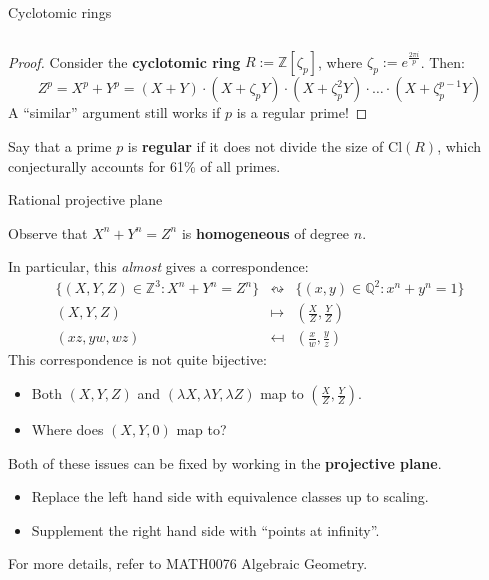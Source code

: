 \documentclass[10pt]{beamer}
\theoremstyle{definition}
\begin{document}
\begin{frame}[t]{Cyclotomic rings}
\begin{columns}[T]
\end{columns}

\begin{proof}
Consider the \textbf{cyclotomic ring} $ R := \mathbb{Z}[\zeta_p] $, where $ \zeta_p := e^{\frac{2\pi i}{p}} $. Then:
$$ Z^p = X^p + Y^p = (X + Y) \cdot (X + \zeta_pY) \cdot (X + \zeta_p^2Y) \cdot \dots \cdot (X + \zeta_p^{p - 1}Y) $$
A ``similar'' argument still works if $ p $ is a regular prime!
\end{proof}

\vspace{0.5cm} Say that a prime $ p $ is \textbf{regular} if it does not divide the size of $ \mathrm{Cl}(R) $, which conjecturally accounts for 61\% of all primes.

\end{frame}

\begin{frame}[t]{Rational projective plane}

Observe that $ X^n + Y^n = Z^n $ is \textbf{homogeneous} of degree $ n $.

\vspace{0.5cm} In particular, this \emph{almost} gives a correspondence:
$$
\begin{array}{rcl}
\{(X, Y, Z) \in \mathbb{Z}^3 : X^n + Y^n = Z^n\} & \leftrightsquigarrow & \{(x, y) \in \mathbb{Q}^2 : x^n + y^n = 1\} \\
(X, Y, Z) & \mapsto & (\tfrac{X}{Z}, \tfrac{Y}{Z}) \\
(xz, yw, wz) & \mapsfrom & (\tfrac{x}{w}, \tfrac{y}{z})
\end{array}
$$
This correspondence is not quite bijective:
\begin{itemize}
\item Both $ (X, Y, Z) $ and $ (\lambda X, \lambda Y, \lambda Z) $ map to $ (\tfrac{X}{Z}, \tfrac{Y}{Z}) $.
\item Where does $ (X, Y, 0) $ map to?
\end{itemize}
Both of these issues can be fixed by working in the \textbf{projective plane}.
\begin{itemize}
\item Replace the left hand side with equivalence classes up to scaling.
\item Supplement the right hand side with ``points at infinity''.
\end{itemize}

\vspace{0.5cm} For more details, refer to MATH0076 Algebraic Geometry.

\end{frame}
\end{document}
